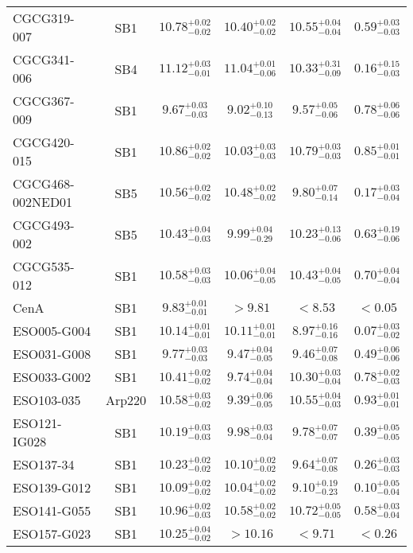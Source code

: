 \documentclass[onecolumn]{mn2e}
\begin{document}
{\begin{center}
\begin{longtable}{lccccc}
CGCG319-007 & SB1 & $10.78_{-0.02}^{+0.02}$ & $10.40_{-0.02}^{+0.02}$ & $10.55_{-0.04}^{+0.04}$ &$0.59_{-0.03}^{+0.03}$ \\
CGCG341-006 & SB4 & $11.12_{-0.01}^{+0.03}$ & $11.04_{-0.06}^{+0.01}$ & $10.33_{-0.09}^{+0.31}$ &$0.16_{-0.03}^{+0.15}$ \\
CGCG367-009 & SB1 & $9.67_{-0.03}^{+0.03}$ & $9.02_{-0.13}^{+0.10}$ & $9.57_{-0.06}^{+0.05}$ &$0.78_{-0.06}^{+0.06}$ \\
CGCG420-015 & SB1 & $10.86_{-0.02}^{+0.02}$ & $10.03_{-0.03}^{+0.03}$ & $10.79_{-0.03}^{+0.03}$ &$0.85_{-0.01}^{+0.01}$ \\
CGCG468-002NED01 & SB5 & $10.56_{-0.02}^{+0.02}$ & $10.48_{-0.02}^{+0.02}$ & $9.80_{-0.14}^{+0.07}$ &$0.17_{-0.04}^{+0.03}$ \\
CGCG493-002 & SB5 & $10.43_{-0.03}^{+0.04}$ & $9.99_{-0.29}^{+0.04}$ & $10.23_{-0.06}^{+0.13}$ &$0.63_{-0.06}^{+0.19}$ \\
CGCG535-012 & SB1 & $10.58_{-0.03}^{+0.03}$ & $10.06_{-0.05}^{+0.04}$ & $10.43_{-0.05}^{+0.04}$ &$0.70_{-0.04}^{+0.04}$ \\
CenA & SB1 & $9.83_{-0.01}^{+0.01}$ & $>9.81$ & $<8.53$ &$<0.05$ \\
ESO005-G004 & SB1 & $10.14_{-0.01}^{+0.01}$ & $10.11_{-0.01}^{+0.01}$ & $8.97_{-0.16}^{+0.16}$ &$0.07_{-0.02}^{+0.03}$ \\
ESO031-G008 & SB1 & $9.77_{-0.03}^{+0.03}$ & $9.47_{-0.05}^{+0.04}$ & $9.46_{-0.08}^{+0.07}$ &$0.49_{-0.06}^{+0.06}$ \\
ESO033-G002 & SB1 & $10.41_{-0.02}^{+0.02}$ & $9.74_{-0.04}^{+0.04}$ & $10.30_{-0.04}^{+0.03}$ &$0.78_{-0.03}^{+0.02}$ \\
ESO103-035 & Arp220 & $10.58_{-0.02}^{+0.03}$ & $9.39_{-0.05}^{+0.06}$ & $10.55_{-0.03}^{+0.04}$ &$0.93_{-0.01}^{+0.01}$ \\
ESO121-IG028 & SB1 & $10.19_{-0.03}^{+0.03}$ & $9.98_{-0.04}^{+0.03}$ & $9.78_{-0.07}^{+0.07}$ &$0.39_{-0.05}^{+0.05}$ \\
ESO137-34 & SB1 & $10.23_{-0.02}^{+0.02}$ & $10.10_{-0.02}^{+0.02}$ & $9.64_{-0.08}^{+0.07}$ &$0.26_{-0.03}^{+0.03}$ \\
ESO139-G012 & SB1 & $10.09_{-0.02}^{+0.02}$ & $10.04_{-0.02}^{+0.02}$ & $9.10_{-0.23}^{+0.19}$ &$0.10_{-0.04}^{+0.05}$ \\
ESO141-G055 & SB1 & $10.96_{-0.03}^{+0.02}$ & $10.58_{-0.02}^{+0.02}$ & $10.72_{-0.05}^{+0.05}$ &$0.58_{-0.04}^{+0.03}$ \\
ESO157-G023 & SB1 & $10.25_{-0.02}^{+0.04}$ & $>10.16$ & $<9.71$ &$<0.26$ \\

\end{longtable}
\end{center}}
\end{document}
